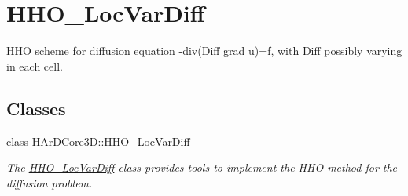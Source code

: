 \hypertarget{group__HHO__LocVarDiff}{}\section{H\+H\+O\+\_\+\+Loc\+Var\+Diff}
\label{group__HHO__LocVarDiff}


H\+HO scheme for diffusion equation -\/div(Diff grad u)=f, with Diff possibly varying in each cell.  


\subsection*{Classes}
\begin{DoxyCompactItemize}
\item 
class \hyperlink{classHArDCore3D_1_1HHO__LocVarDiff}{H\+Ar\+D\+Core3\+D\+::\+H\+H\+O\+\_\+\+Loc\+Var\+Diff}
\begin{DoxyCompactList}\small\item\em The \hyperlink{classHArDCore3D_1_1HHO__LocVarDiff}{H\+H\+O\+\_\+\+Loc\+Var\+Diff} class provides tools to implement the H\+HO method for the diffusion problem. \end{DoxyCompactList}\end{DoxyCompactItemize}
